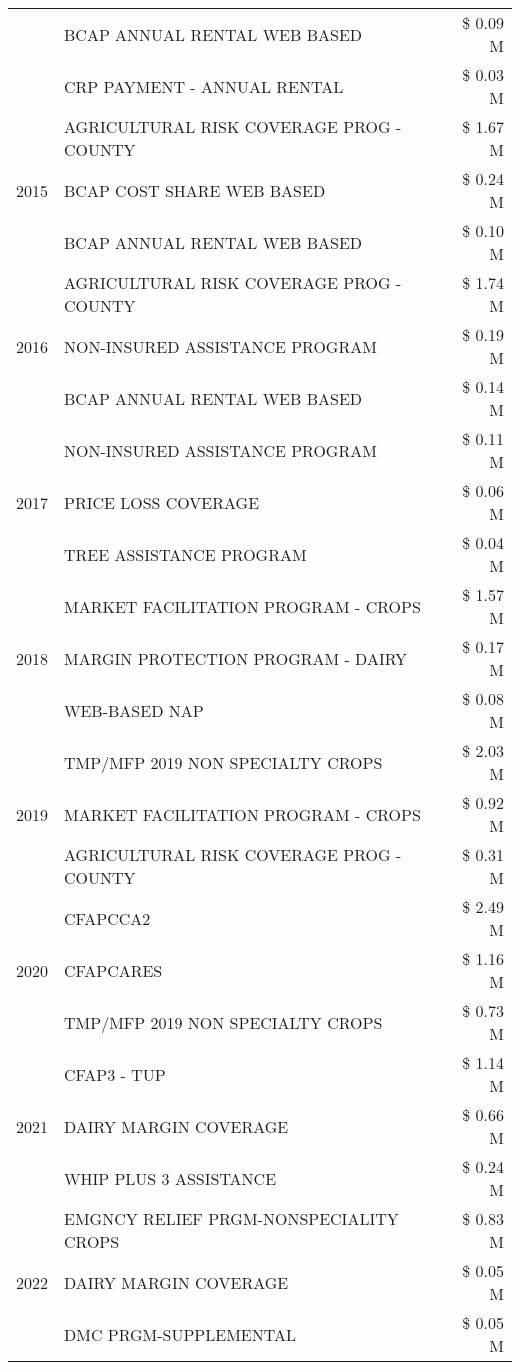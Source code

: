 \begin{tabular}{llr}
 & BCAP ANNUAL RENTAL WEB BASED & \$ 0.09 M \\
 & CRP PAYMENT - ANNUAL RENTAL & \$ 0.03 M \\
\cline{1-3}
\multirow[t]{3}{*}{2015} & AGRICULTURAL RISK COVERAGE PROG - COUNTY & \$ 1.67 M \\
 & BCAP COST SHARE WEB BASED & \$ 0.24 M \\
 & BCAP ANNUAL RENTAL WEB BASED & \$ 0.10 M \\
\cline{1-3}
\multirow[t]{3}{*}{2016} & AGRICULTURAL RISK COVERAGE PROG - COUNTY & \$ 1.74 M \\
 & NON-INSURED ASSISTANCE PROGRAM & \$ 0.19 M \\
 & BCAP ANNUAL RENTAL WEB BASED & \$ 0.14 M \\
\cline{1-3}
\multirow[t]{3}{*}{2017} & NON-INSURED ASSISTANCE PROGRAM & \$ 0.11 M \\
 & PRICE LOSS COVERAGE & \$ 0.06 M \\
 & TREE ASSISTANCE PROGRAM & \$ 0.04 M \\
\cline{1-3}
\multirow[t]{3}{*}{2018} & MARKET FACILITATION PROGRAM - CROPS & \$ 1.57 M \\
 & MARGIN PROTECTION PROGRAM - DAIRY & \$ 0.17 M \\
 & WEB-BASED NAP & \$ 0.08 M \\
\cline{1-3}
\multirow[t]{3}{*}{2019} & TMP/MFP 2019 NON SPECIALTY CROPS & \$ 2.03 M \\
 & MARKET FACILITATION PROGRAM - CROPS & \$ 0.92 M \\
 & AGRICULTURAL RISK COVERAGE PROG - COUNTY & \$ 0.31 M \\
\cline{1-3}
\multirow[t]{3}{*}{2020} & CFAPCCA2 & \$ 2.49 M \\
 & CFAPCARES & \$ 1.16 M \\
 & TMP/MFP 2019 NON SPECIALTY CROPS & \$ 0.73 M \\
\cline{1-3}
\multirow[t]{3}{*}{2021} & CFAP3 - TUP & \$ 1.14 M \\
 & DAIRY MARGIN COVERAGE & \$ 0.66 M \\
 & WHIP PLUS 3 ASSISTANCE & \$ 0.24 M \\
\cline{1-3}
\multirow[t]{3}{*}{2022} & EMGNCY RELIEF PRGM-NONSPECIALITY CROPS & \$ 0.83 M \\
 & DAIRY MARGIN COVERAGE & \$ 0.05 M \\
 & DMC PRGM-SUPPLEMENTAL & \$ 0.05 M \\
\cline{1-3}
\bottomrule
\end{tabular}
